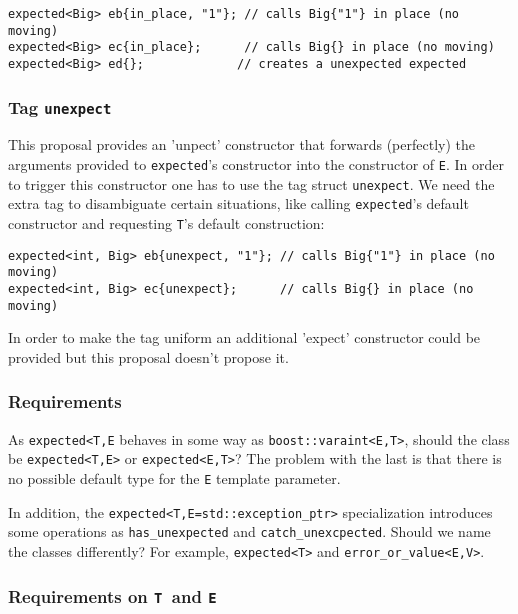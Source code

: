 \documentclass[a4paper,10pt]{article}
\newcommand{\cpp}[1]{\lstinline{#1}}
\begin{document}
\begin{lstlisting}
expected<Big> eb{in_place, "1"}; // calls Big{"1"} in place (no moving)
expected<Big> ec{in_place};      // calls Big{} in place (no moving)
expected<Big> ed{};             // creates a unexpected expected
\end{lstlisting}


\subsubsection{Tag \cpp{unexpect}}

This proposal provides an 'unpect' constructor that forwards (perfectly) the arguments provided to \cpp{expected}'s constructor into the constructor of \cpp{E}. In order to trigger this constructor one has to use the tag struct \cpp{unexpect}. We need the extra tag to disambiguate certain situations, like calling \cpp{expected}'s default constructor and requesting \cpp{T}'s default construction:

\begin{lstlisting}
expected<int, Big> eb{unexpect, "1"}; // calls Big{"1"} in place (no moving)
expected<int, Big> ec{unexpect};      // calls Big{} in place (no moving)
\end{lstlisting}

In order to make the tag uniform an additional 'expect' constructor could be provided but this proposal doesn't propose it.

\subsubsection{Requirements}

As \cpp{expected<T,E} behaves in some way as \cpp{boost::varaint<E,T>}, should the class be \cpp{expected<T,E>} or \cpp{expected<E,T>}?
The problem with the last is that there is no possible default type for the \cpp{E} template parameter.

In addition, the \cpp{expected<T,E=std::exception_ptr>} specialization introduces some operations as \cpp{has_unexpected} and \cpp{catch_unexcpected}. Should we name the classes differently? For example, \cpp{expected<T>} and \cpp{error_or_value<E,V>}.


\subsubsection{Requirements on \cpp{T} and \cpp{E}}
\end{document}
